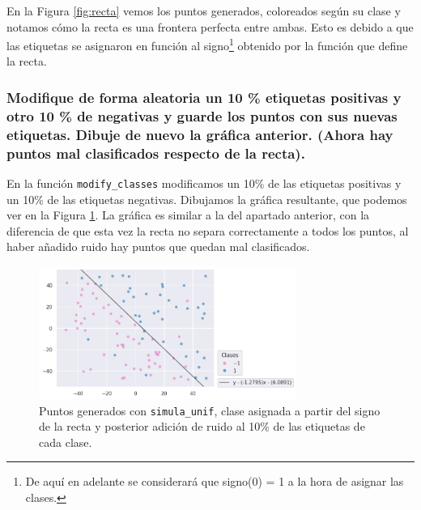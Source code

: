 \documentclass[a4paper, 20pt]{article}
\begin{document}
En la Figura \ref{fig:recta} vemos los puntos generados, coloreados según su clase y notamos cómo la recta es una frontera perfecta entre ambas. Esto es debido a que las etiquetas se asignaron en función al signo\footnote{De aquí en adelante se considerará que signo(0) = 1 a la hora de asignar las clases.} obtenido por la función que define la recta.

\subsubsection{Modifique de forma aleatoria un 10 \% etiquetas positivas y otro 10 \% de negativas y guarde los puntos con sus nuevas etiquetas. Dibuje de nuevo la gráfica anterior. (Ahora hay puntos mal clasificados respecto de la recta).}

En la función \texttt{modify\_classes} modificamos un 10\% de las etiquetas positivas y un 10\% de las etiquetas negativas. Dibujamos la gráfica resultante, que podemos ver en la Figura \ref{fig:2b}. La gráfica es similar a la del apartado anterior, con la diferencia de que esta vez la recta no separa correctamente a todos los puntos, al haber añadido ruido hay puntos que quedan mal clasificados.

\begin{figure}[H]
    \centering
    \includegraphics[width=0.75\textwidth]{recta+ruido}
    \caption{Puntos generados con \texttt{simula\_unif}, clase asignada a partir del signo de la recta y posterior adición de ruido al 10\% de las etiquetas de cada clase.}
    \label{fig:2b}
\end{figure}
\end{document}
